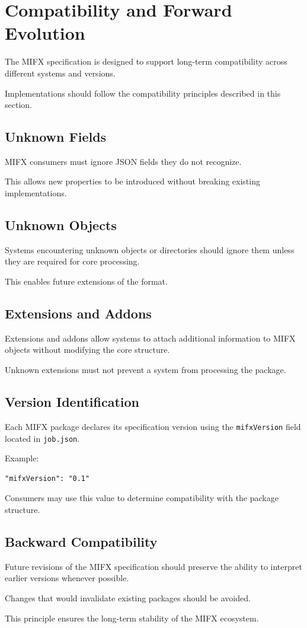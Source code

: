 \section{Compatibility and Forward Evolution}

The MIFX specification is designed to support long-term compatibility across different systems and versions.

Implementations should follow the compatibility principles described in this section.

\subsection{Unknown Fields}

MIFX consumers must ignore JSON fields they do not recognize.

This allows new properties to be introduced without breaking existing implementations.

\subsection{Unknown Objects}

Systems encountering unknown objects or directories should ignore them unless they are required for core processing.

This enables future extensions of the format.

\subsection{Extensions and Addons}

Extensions and addons allow systems to attach additional information to MIFX objects without modifying the core structure.

Unknown extensions must not prevent a system from processing the package.

\subsection{Version Identification}

Each MIFX package declares its specification version using the \texttt{mifxVersion} field located in \texttt{job.json}.

Example:

\begin{verbatim}
"mifxVersion": "0.1"
\end{verbatim}

Consumers may use this value to determine compatibility with the package structure.

\subsection{Backward Compatibility}

Future revisions of the MIFX specification should preserve the ability to interpret earlier versions whenever possible.

Changes that would invalidate existing packages should be avoided.

This principle ensures the long-term stability of the MIFX ecosystem.